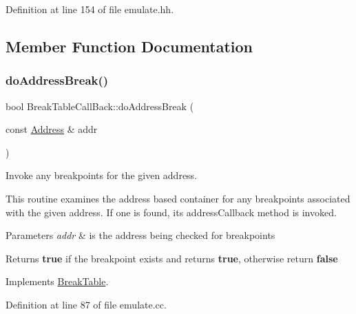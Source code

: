 Definition at line 154 of file emulate.\+hh.



\subsection{Member Function Documentation}
\mbox{\label{class_break_table_call_back_af2d28bc35a414feed38205b41f387afc}} 
\subsubsection{\texorpdfstring{doAddressBreak()}{doAddressBreak()}}
{\footnotesize\ttfamily bool Break\+Table\+Call\+Back\+::do\+Address\+Break (\begin{DoxyParamCaption}\item[{const \mbox{\hyperlink{class_address}{Address}} \&}]{addr }\end{DoxyParamCaption})\hspace{0.3cm}{\ttfamily [virtual]}}



Invoke any breakpoints for the given address. 

This routine examines the address based container for any breakpoints associated with the given address. If one is found, its address\+Callback method is invoked. 
\begin{DoxyParams}{Parameters}
{\em addr} & is the address being checked for breakpoints \\
\hline
\end{DoxyParams}
\begin{DoxyReturn}{Returns}
{\bfseries{true}} if the breakpoint exists and returns {\bfseries{true}}, otherwise return {\bfseries{false}} 
\end{DoxyReturn}


Implements \mbox{\hyperlink{class_break_table_a7833a73318fadd483f73fbd33bdffd23}{Break\+Table}}.



Definition at line 87 of file emulate.\+cc.

\mbox{\label{class_break_table_call_back_a16b989de8c0b55d15940ac41bf7cdd73}} 
